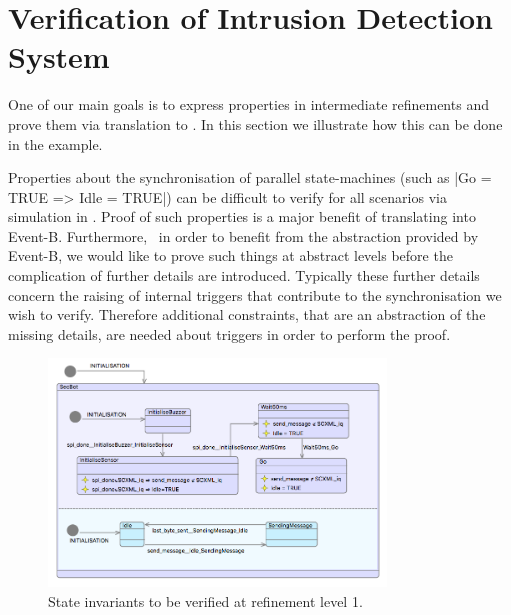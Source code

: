 
\section{Verification of Intrusion Detection System}
\label{sec:example}

One of our main goals is to express properties in \SCXML intermediate refinements and prove them via translation to \EventB.
In this section we illustrate how this can be done in the \IDS example.

Properties about the synchronisation of parallel state-machines (such as |Go = TRUE => Idle = TRUE|)
can be difficult to verify for all scenarios via simulation in \SCXML. 
Proof of such properties is a major benefit of translating into Event-B.  
Furthermore,  in order to benefit from the abstraction provided by Event-B, we would like to prove such things at abstract levels before the complication of further details are introduced. 
Typically these further details concern the raising of internal triggers that contribute to the synchronisation we wish to verify. 
Therefore additional constraints, that are an abstraction of the missing details, are needed about triggers in order to perform the proof.
\begin{figure}[!h]
	\vspace{-.4cm}
	\centering
	\includegraphics[width=0.8\textwidth]{figures/iumlb_verif}
	\caption{State invariants to be verified at refinement level 1.}
	\label{fig:iumlb-verif}
	\vspace{-.4cm}
\end{figure}

